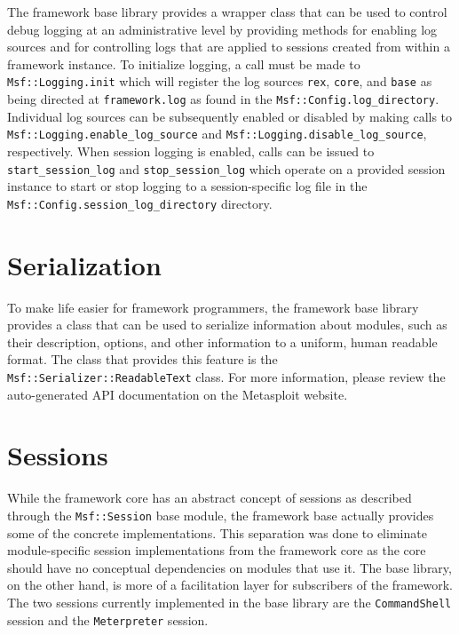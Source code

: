 \documentclass{report}
\begin{document}
\par
The framework base library provides a wrapper class that can be used
to control debug logging at an administrative level by providing
methods for enabling log sources and for controlling logs that are
applied to sessions created from within a framework instance.  To
initialize logging, a call must be made to
\texttt{Msf::Logging.init} which will register the log sources
\texttt{rex}, \texttt{core}, and \texttt{base} as being directed at
\texttt{framework.log} as found in the
\texttt{Msf::Config.log\_directory}.  Individual log sources can be
subsequently enabled or disabled by making calls to
\texttt{Msf::Logging.enable\_log\_source} and
\texttt{Msf::Logging.disable\_log\_source}, respectively.  When
session logging is enabled, calls can be issued to
\texttt{start\_session\_log} and \texttt{stop\_session\_log} which
operate on a provided session instance to start or stop logging to a
session-specific log file in the
\texttt{Msf::Config.session\_log\_directory} directory.

    \section{Serialization}

\par
To make life easier for framework programmers, the framework base
library provides a class that can be used to serialize information
about modules, such as their description, options, and other
information to a uniform, human readable format.  The class that
provides this feature is the \texttt{Msf::Serializer::ReadableText}
class.  For more information, please review the auto-generated API
documentation on the Metasploit website.

    \section{Sessions}

\par
While the framework core has an abstract concept of sessions as
described through the \texttt{Msf::Session} base module, the
framework base actually provides some of the concrete
implementations.  This separation was done to eliminate
module-specific session implementations from the framework core as
the core should have no conceptual dependencies on modules that use
it.  The base library, on the other hand, is more of a facilitation
layer for subscribers of the framework.  The two sessions currently
implemented in the base library are the \texttt{CommandShell}
session and the \texttt{Meterpreter} session.
\end{document}
